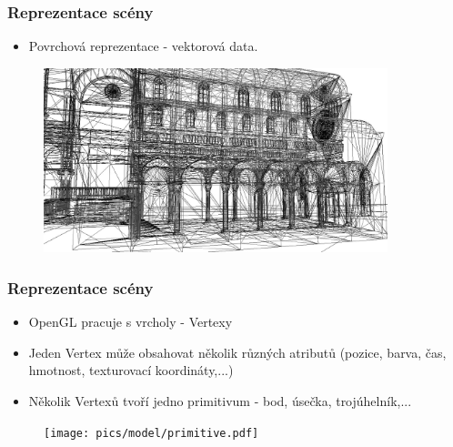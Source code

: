 
\begin{frame}
\frametitle{Reprezentace scény}
	\begin{itemize}
		\item{Povrchová reprezentace - vektorová data.}
	\end{itemize}
	\begin{figure}[h]
		\includegraphics[width=10cm,keepaspectratio]{pics/model/wireframe.jpg}
	\end{figure}
\end{frame}

\begin{frame}
\frametitle{Reprezentace scény}
	\begin{itemize}
		\item{OpenGL pracuje s vrcholy - Vertexy}
		\item{Jeden Vertex může obsahovat několik různých atributů (pozice, barva, čas, hmotnost, texturovací koordináty,...)}
		\item{Několik Vertexů tvoří jedno primitivum - bod, úsečka, trojúhelník,...}
	\end{itemize}
	\begin{figure}[h]
		\texttt{[image: pics/model/primitive.pdf]}
	\end{figure}
\end{frame}


